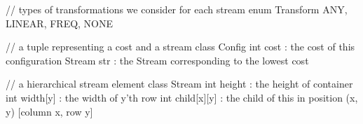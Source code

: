 // types of transformations we consider for each stream
enum Transform { ANY, LINEAR, FREQ, NONE }

// a tuple representing a cost and a stream
class Config {
  int cost          : the cost of this configuration
  Stream str        : the Stream corresponding to the lowest cost
}

// a hierarchical stream element
class Stream {
  int height        : the height of container
  int width[y]      : the width of y'th row
  int child[x][y]   : the child of this in position (x, y)  [column x, row y]
}